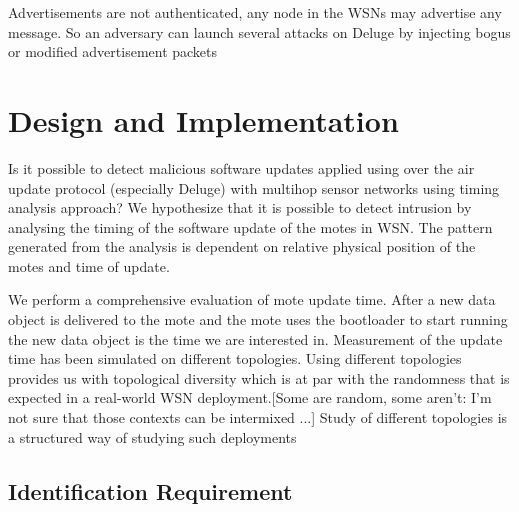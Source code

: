 \documentclass[conference,man]{IEEEtran}
\begin{document}
Advertisements are not authenticated, any node in the WSNs may advertise any message. So an adversary can 
launch several attacks on Deluge by injecting bogus or modified advertisement packets 




\section{Design and Implementation}

Is it possible to detect malicious software updates applied using over the air update protocol (especially Deluge) with multihop sensor networks using timing analysis approach?
We hypothesize that it is possible to detect intrusion by analysing the timing of the software update of the motes in WSN.
The pattern generated from the analysis is dependent on relative physical position of the motes and time of update.

We perform a comprehensive evaluation of mote update time.
After a new data object is delivered to the mote and the mote uses the bootloader to start running the new data object is the time we are interested in.
Measurement of the update time has been simulated on different topologies. 
Using different topologies provides us with topological diversity which is at par with the 
randomness that is expected in a real-world WSN deployment.[Some are random, some aren't: I'm not sure that those contexts can be intermixed ...]
Study of different topologies is a structured way of studying such deployments
\label{sec:deg}


\subsection{Identification Requirement}
\end{document}
